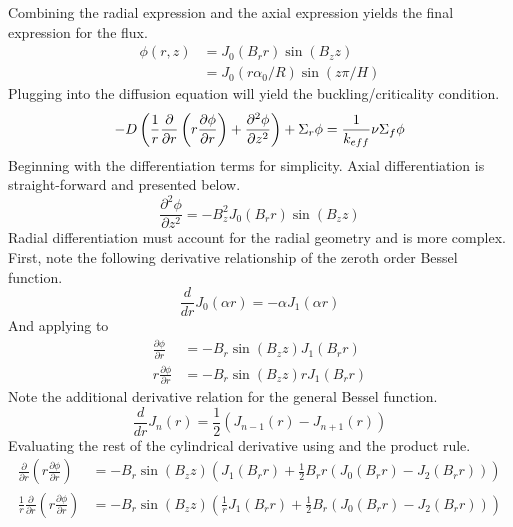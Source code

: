   Combining the radial expression  and the axial 
  expression  yields the final expression for the flux.
  \begin{align} \label{eq:cyl_flux}
    \phi(r,z) &= J_0(B_r r) \sin(B_z z) \\
    &= J_0(r \alpha_0 / R) \sin(z \pi / H)
  \end{align}
  Plugging  into the diffusion equation will yield the 
  buckling/criticality condition.
  \begin{equation}
    -D \left( \frac{1}{r} \frac{\partial}{\partial r} \left( r 
      \frac{\partial \phi}{\partial r} \right) + \frac{\partial^2 \phi}
      {\partial z^2} \right) + \Sigma_r \phi = \frac{1}{k_{eff}} \nu 
      \Sigma_f \phi
  \end{equation}
  Beginning with the differentiation terms for simplicity. Axial 
  differentiation is straight-forward and presented below.
  \begin{equation}
    \label{eq:above}
    \frac{\partial^2 \phi}{\partial z^2} = -B_z^2 J_0(B_r r) \sin(B_z z)
  \end{equation}
  Radial differentiation must account for the radial geometry and is more 
  complex. First, note the following derivative relationship of the zeroth
  order Bessel function.
  \begin{equation} \label{eq:deriv_bessel0}
    \frac{d}{dr} J_0(\alpha r) = - \alpha J_1(\alpha r)
  \end{equation}
  And applying  to 
  \begin{align}
    \frac{\partial \phi}{\partial r} &= -B_r \sin(B_z z) J_1(B_r r) \\
    r \frac{\partial \phi}{\partial r} &= -B_r \sin(B_z z) r J_1 (B_r r) 
  \end{align}
  Note the additional derivative relation for the general Bessel function.
  \begin{equation} \label{eq:deriv_besseln}
    \frac{d}{dr} J_n(r) = \frac{1}{2} \left( J_{n-1}(r) - J_{n+1}(r)\right)
  \end{equation}
  Evaluating the rest of the cylindrical derivative using
   and the product rule.
  \begin{align}
    \frac{\partial}{\partial r} \left( r \frac{\partial \phi}{\partial r}
      \right) &= -B_r \sin(B_z z) \left(J_1(B_r r) + \frac{1}{2} B_r r \left(
      J_0(B_r r) - J_2(B_r r) \right) \right) \\
    \frac{1}{r} \frac{\partial}{\partial r} \left(r 
      \frac{\partial \phi}{\partial r} \right) &=
      -B_r \sin(B_z z) \left(\frac{1}{r} J_1(B_r r) + \frac{1}{2} B_r \left(
      J_0(B_r r) - J_2(B_r r) \right) \right)
  \end{align}
